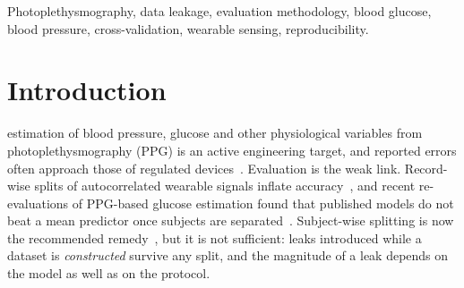 \documentclass[journal]{IEEEtran}
\begin{document}
\begin{IEEEkeywords}
Photoplethysmography, data leakage, evaluation methodology, blood glucose,
blood pressure, cross-validation, wearable sensing, reproducibility.
\end{IEEEkeywords}

\section{Introduction}
 estimation of blood pressure, glucose and other
physiological variables from photoplethysmography (PPG) is an active
engineering target, and reported errors often approach those of regulated
devices~\cite{soliman2024,syamsul2026,chen2024mvcft}.  Evaluation is the weak
link.  Record-wise splits of autocorrelated wearable signals inflate
accuracy~\cite{yoshizawa2023,mehta2024,cheung2024}, and recent re-evaluations
of PPG-based glucose estimation found that published models do not beat a
mean predictor once subjects are separated~\cite{ramesh2026,seyedebrahimi2026}.
Subject-wise splitting is now the recommended
remedy~\cite{saeb2017,collins2024tripod}, but it is not sufficient: leaks
introduced while a dataset is \emph{constructed} survive any split, and the
magnitude of a leak depends on the model as well as on the protocol.
\end{document}
